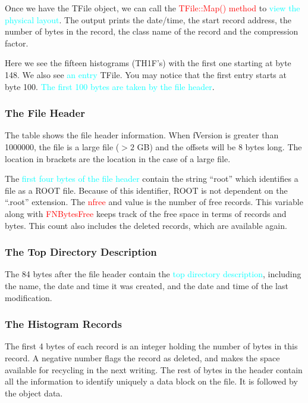 \documentclass[12pt,a4paper]{article}
\begin{document}
Once we have the TFile object, we can call the \textcolor{red}{TFile::Map() method} to \textcolor{cyan}{view the physical layout}. The output prints the date/time, the start record address, the number of bytes in the record, the class name of the record and the compression factor.

Here we see the fifteen histograms (TH1F’s) with the first one starting at byte 148. We also see \textcolor{cyan}{an entry} TFile. You may notice that the first entry starts at byte 100. \textcolor{cyan}{The first 100 bytes are taken by the file header}.

\subsubsection{The File Header}
The table shows the file header information. When fVersion is greater than 1000000, the file is a large file ($> 2$ GB) and the offsets will be 8 bytes long. The location in brackets are the location in the case of a large file.

The \textcolor{cyan}{first four bytes of the file header} contain the string ``root” which identifies a file as a ROOT file. Because of this identifier, ROOT is not dependent on the “.root” extension. The \textcolor{red}{nfree} and value is the number of free records. This variable along with \textcolor{red}{FNBytesFree} keeps track of the free space in terms of records and bytes. This count also includes the deleted records, which are available again. 

\subsubsection{The Top Directory Description}
The 84 bytes after the file header contain the \textcolor{cyan}{top directory description}, including the name, the date and time it was created, and the date and time of the last modification.

\subsubsection{The Histogram Records}
The first 4 bytes of each record is an integer holding the number of bytes in this record. A negative number flags the record as deleted, and makes the space available for recycling in the next writing. The rest of bytes in the header contain all the information to identify uniquely a data block on the file. It is followed by the object data.
\end{document}
